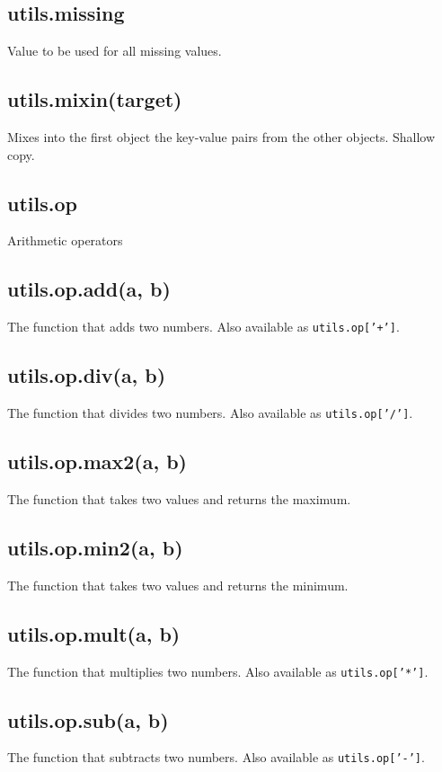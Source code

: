\documentclass{article}
\begin{document}
    \subsection{utils.missing}
    Value to be used for all missing values.


    \subsection{utils.mixin(target)}
    Mixes into the first object the key-value pairs from the other objects.
Shallow copy.


    \subsection{utils.op}
    Arithmetic operators


    \subsection{utils.op.add(a, b)}
    The function that adds two numbers. Also available as \texttt{utils.op['+']}.


    \subsection{utils.op.div(a, b)}
    The function that divides two numbers. Also available as \texttt{utils.op['/']}.


    \subsection{utils.op.max2(a, b)}
    The function that takes two values and returns the maximum.


    \subsection{utils.op.min2(a, b)}
    The function that takes two values and returns the minimum.


    \subsection{utils.op.mult(a, b)}
    The function that multiplies two numbers. Also available as \texttt{utils.op['*']}.


    \subsection{utils.op.sub(a, b)}
    The function that subtracts two numbers. Also available as \texttt{utils.op['-']}.
\end{document}
